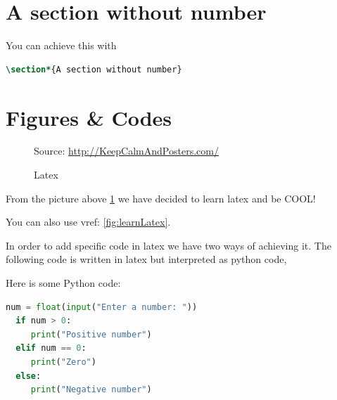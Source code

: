 \section*{A section without number}

You can achieve this with

\begin{lstlisting}[language=Latex,%
  caption={Example of a section command without numbering},%
  label=lst:latex_section_no_number,%
  style=mystyle]
  \section*{A section without number}
\end{lstlisting}
  

\section{Figures \& Codes}
\label{sec:fig}

\begin{figure}[thb]
  \centering

    {\scriptsize Source: \url{http://KeepCalmAndPosters.com/}%
  }

  \caption{Latex}
  \label{fig:learnLatex}
\end{figure}

From the picture above \ref{fig:learnLatex} we have decided to learn latex and
be COOL!

You can also use vref: \vref{fig:learnLatex}.

In order to add specific code in latex we have two ways of achieving it.
The following code is written in latex but interpreted as python code,


Here is some Python code:

\lstset{style=mystyle} 
\begin{lstlisting}[language=Python, caption= Python Example Code]
  num = float(input("Enter a number: "))
  if num > 0:
     print("Positive number")
  elif num == 0:
     print("Zero")
  else:
     print("Negative number")
\end{lstlisting}

